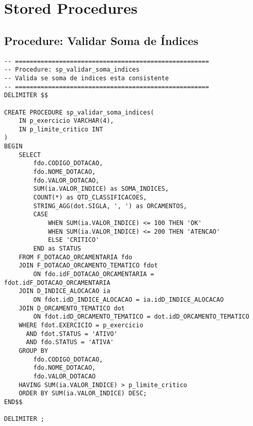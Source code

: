 \documentclass[12pt,a4paper]{article}
\begin{document}
\section{Stored Procedures}

\subsection{Procedure: Validar Soma de Índices}

\begin{lstlisting}
-- =====================================================
-- Procedure: sp_validar_soma_indices
-- Valida se soma de indices esta consistente
-- =====================================================
DELIMITER $$

CREATE PROCEDURE sp_validar_soma_indices(
    IN p_exercicio VARCHAR(4),
    IN p_limite_critico INT
)
BEGIN
    SELECT 
        fdo.CODIGO_DOTACAO,
        fdo.NOME_DOTACAO,
        fdo.VALOR_DOTACAO,
        SUM(ia.VALOR_INDICE) as SOMA_INDICES,
        COUNT(*) as QTD_CLASSIFICACOES,
        STRING_AGG(dot.SIGLA, ', ') as ORCAMENTOS,
        CASE 
            WHEN SUM(ia.VALOR_INDICE) <= 100 THEN 'OK'
            WHEN SUM(ia.VALOR_INDICE) <= 200 THEN 'ATENCAO'
            ELSE 'CRITICO'
        END as STATUS
    FROM F_DOTACAO_ORCAMENTARIA fdo
    JOIN F_DOTACAO_ORCAMENTO_TEMATICO fdot
        ON fdo.idF_DOTACAO_ORCAMENTARIA = fdot.idF_DOTACAO_ORCAMENTARIA
    JOIN D_INDICE_ALOCACAO ia
        ON fdot.idD_INDICE_ALOCACAO = ia.idD_INDICE_ALOCACAO
    JOIN D_ORCAMENTO_TEMATICO dot
        ON fdot.idD_ORCAMENTO_TEMATICO = dot.idD_ORCAMENTO_TEMATICO
    WHERE fdot.EXERCICIO = p_exercicio
      AND fdot.STATUS = 'ATIVO'
      AND fdo.STATUS = 'ATIVA'
    GROUP BY 
        fdo.CODIGO_DOTACAO,
        fdo.NOME_DOTACAO,
        fdo.VALOR_DOTACAO
    HAVING SUM(ia.VALOR_INDICE) > p_limite_critico
    ORDER BY SUM(ia.VALOR_INDICE) DESC;
END$$

DELIMITER ;
\end{lstlisting}
\end{document}

